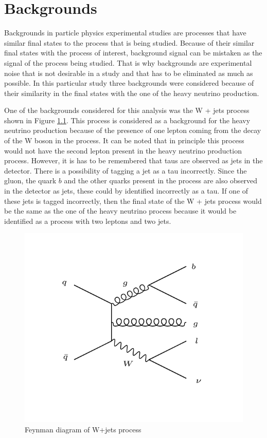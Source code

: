 \graphicspath{{Backgrounds/Figures/}}

\chapter{Backgrounds}

Backgrounds in particle physics experimental studies are processes that have similar final states to the process that is being studied. Because of their similar final states with the process of interest, background signal can be mistaken as the signal of the process being studied. That is why backgrounds are experimental noise that is not desirable in a study and that has to be eliminated as much as possible. In this particular study three backgrounds were considered because of their similarity in the final states with the one of the heavy neutrino production. 

One of the backgrounds considered for this analysis was the W + jets process shown in Figure \ref{fig: Wjets_background}. This process is considered as a background for the heavy neutrino production because of the presence of one lepton coming from the decay of the W boson in the process. It can be noted that in principle this process would not have the second lepton present in the heavy neutrino production process. However, it is has to be remembered that taus are observed as jets in the detector. There is a possibility of tagging a jet as a tau incorrectly. Since the gluon, the quark $b$ and the other quarks present in the process are also observed in the detector as jets, these could by identified incorrectly as a tau. If one of these jets is tagged incorrectly, then the final state of the W + jets process would be the same as the one of the heavy neutrino process because it would be identified as a process with two leptons and two jets. 

\begin{figure}[H]
\centering
\includegraphics[width = \linewidth]{Wjets}
\caption{Feynman diagram of W+jets process}
\label{fig: Wjets_background}
\end{figure}



